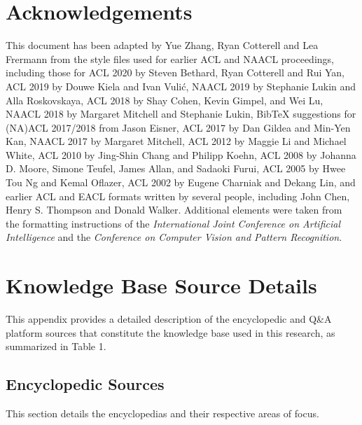 \documentclass[11pt]{article}
\begin{document}
\section*{Acknowledgements}
This document has been adapted by Yue Zhang, Ryan Cotterell and Lea Frermann from the style files used for earlier ACL and NAACL proceedings, including those for 
ACL 2020 by Steven Bethard, Ryan Cotterell and Rui Yan,
ACL 2019 by Douwe Kiela and Ivan Vuli\'{c},
NAACL 2019 by Stephanie Lukin and Alla Roskovskaya, 
ACL 2018 by Shay Cohen, Kevin Gimpel, and Wei Lu, 
NAACL 2018 by Margaret Mitchell and Stephanie Lukin,
Bib\TeX{} suggestions for (NA)ACL 2017/2018 from Jason Eisner,
ACL 2017 by Dan Gildea and Min-Yen Kan, NAACL 2017 by Margaret Mitchell, 
ACL 2012 by Maggie Li and Michael White, 
ACL 2010 by Jing-Shin Chang and Philipp Koehn, 
ACL 2008 by Johanna D. Moore, Simone Teufel, James Allan, and Sadaoki Furui, 
ACL 2005 by Hwee Tou Ng and Kemal Oflazer, 
ACL 2002 by Eugene Charniak and Dekang Lin, 
and earlier ACL and EACL formats written by several people, including
John Chen, Henry S. Thompson and Donald Walker.
Additional elements were taken from the formatting instructions of the \emph{International Joint Conference on Artificial Intelligence} and the \emph{Conference on Computer Vision and Pattern Recognition}.




\appendix

\section{Knowledge Base Source Details}
\label{sec:appendix-kb-sources}

This appendix provides a detailed description of the encyclopedic and Q\&A platform sources that constitute the knowledge base used in this research, as summarized in Table 1.

\subsection{Encyclopedic Sources}

This section details the encyclopedias and their respective areas of focus.
\end{document}
